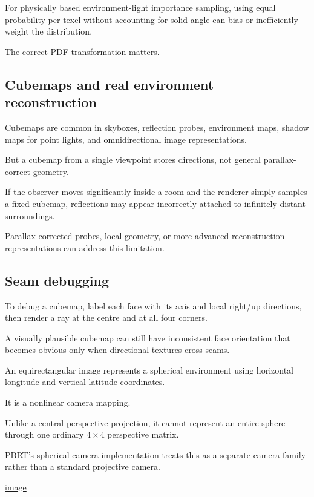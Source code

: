 For physically based environment-light importance sampling, using equal probability per texel without accounting for solid angle can bias or inefficiently weight the distribution.

The correct PDF transformation matters.

\subsection{Cubemaps and real environment reconstruction}\label{02-foundations-ii-ch035-cubemaps-and-real-environment-reconstruction}

Cubemaps are common in skyboxes, reflection probes, environment maps, shadow maps for point lights, and omnidirectional image representations.

But a cubemap from a single viewpoint stores directions, not general parallax-correct geometry.

If the observer moves significantly inside a room and the renderer simply samples a fixed cubemap, reflections may appear incorrectly attached to infinitely distant surroundings.

Parallax-corrected probes, local geometry, or more advanced reconstruction representations can address this limitation.

\subsection{Seam debugging}\label{02-foundations-ii-ch035-seam-debugging}

To debug a cubemap, label each face with its axis and local right/up directions, then render a ray at the centre and at all four corners.

A visually plausible cubemap can still have inconsistent face orientation that becomes obvious only when directional textures cross seams.

An equirectangular image represents a spherical environment using horizontal longitude and vertical latitude coordinates.

It is a nonlinear camera mapping.

Unlike a central perspective projection, it cannot represent an entire sphere through one ordinary \(4\times4\) perspective matrix.

PBRT's spherical-camera implementation treats this as a separate camera family rather than a standard projective camera. 

\href{https://www.google.com/s2/favicons?domain=https://pbr-book.org&sz=32}{image}

